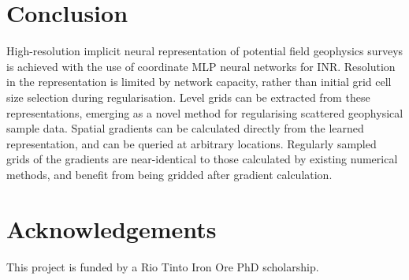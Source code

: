 \section{Conclusion}
High-resolution implicit neural representation of potential field geophysics surveys is achieved with the use of coordinate MLP neural networks for INR\@.
Resolution in the representation is limited by network capacity, rather than initial grid cell size selection during regularisation.
Level grids can be extracted from these representations, emerging as a novel method for regularising scattered geophysical sample data.
Spatial gradients can be calculated directly from the learned representation, and can be queried at arbitrary locations.
Regularly sampled grids of the gradients are near-identical to those calculated by existing numerical methods, and benefit from being gridded after gradient calculation.

\section{Acknowledgements}
This project is funded by a Rio Tinto Iron Ore PhD scholarship.

\printbibliography{}





% 